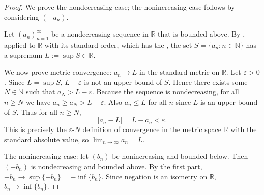 \begin{proof}
    We prove the nondecreasing case; the nonincreasing case follows by considering $(-a_n)$.

    Let $(a_n)_{n=1}^\infty$ be a nondecreasing sequence in $\mathbb{R}$ that is bounded above. By , applied to $\mathbb{R}$ with its standard order, which has the , the set $S = \{a_n : n \in \mathbb{N}\}$ has a supremum $L := \sup S \in \mathbb{R}$.

    We now prove metric convergence: $a_n \to L$ in the standard metric on $\mathbb{R}$. Let $\varepsilon > 0$. Since $L = \sup S$, $L - \varepsilon$ is not an upper bound of $S$. Hence there exists some $N \in \mathbb{N}$ such that $a_N > L - \varepsilon$. Because the sequence is nondecreasing, for all $n \ge N$ we have $a_n \ge a_N > L - \varepsilon$. Also $a_n \le L$ for all $n$ since $L$ is an upper bound of $S$. Thus for all $n \ge N$,
    $$|a_n - L| = L - a_n < \varepsilon.$$
    This is precisely the $\varepsilon$-$N$ definition of convergence in the metric space $\mathbb{R}$ with the standard absolute value, so $\lim_{n \to \infty} a_n = L$.

    The nonincreasing case: let $(b_n)$ be nonincreasing and bounded below. Then $(-b_n)$ is nondecreasing and bounded above. By the first part, $-b_n \to \sup\{-b_n\} = -\inf\{b_n\}$. Since negation is an isometry on $\mathbb{R}$, $b_n \to \inf\{b_n\}$.
\end{proof}